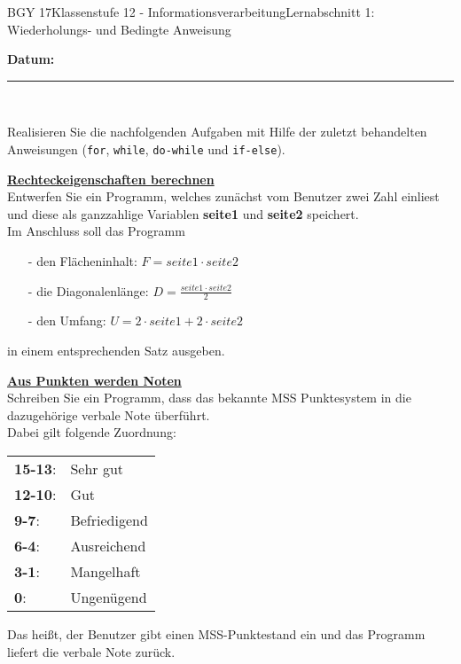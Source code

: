 \documentclass[oneside,openany,headings=optiontotoc,11pt,numbers=noenddot]{scrreprt}
\begin{document}
	\begin{worksheet}{BGY 17}{Klassenstufe 12 - Informationsverarbeitung}{Lernabschnitt 1: Wiederholungs- und Bedingte Anweisung}
				
		\noindent
		\sffamily
		\textbf{Datum:}
		\rule{0.91\textwidth}{0.4pt}\\
		\par\noindent
		Realisieren Sie die nachfolgenden Aufgaben mit Hilfe der zuletzt behandelten Anweisungen (\lstinline[style=JavaInputStyle]{for}, \lstinline[style=JavaInputStyle]{while}, \lstinline[style=JavaInputStyle]{do-while} und \lstinline[style=JavaInputStyle]{if-else}).
		\begin{framed}
			\noindent
			\textbf{\underline{Rechteckeigenschaften berechnen}}\\
			Entwerfen Sie ein Programm, welches zunächst vom Benutzer zwei Zahl einliest und diese als ganzzahlige Variablen \textbf{seite1} und \textbf{seite2} speichert.\\
			Im Anschluss soll das Programm
			\begin{itemize}
				\item[-] den Flächeninhalt: \(F = seite1\cdot{}seite2\)
				\item[-] die Diagonalenlänge: \(D = \frac{seite1\cdot{}seite2}{2}\)
				\item[-] den Umfang: \(U = 2\cdot{}seite1 + 2\cdot{}seite2\)
			\end{itemize}
			in einem entsprechenden Satz ausgeben.
			\par\bigskip\noindent
			\textbf{\underline{Aus Punkten werden Noten}}\\
			Schreiben Sie ein Programm, dass das bekannte MSS Punktesystem in die dazugehörige verbale Note überführt.\\
			Dabei gilt folgende Zuordnung:\\
			\begin{tabularx}{\textwidth}{ll}
				\textbf{15-13}: & Sehr gut\\
				\textbf{12-10}: & Gut\\
				\textbf{9-7}: & Befriedigend\\
				\textbf{6-4}: & Ausreichend\\
				\textbf{3-1}: & Mangelhaft\\
				\textbf{0}: & Ungenügend
			\end{tabularx}
			Das heißt, der Benutzer gibt einen MSS-Punktestand ein und das Programm liefert die verbale Note zurück.
			\par\bigskip\noindent

\end{framed}
\end{worksheet}
\end{document}
